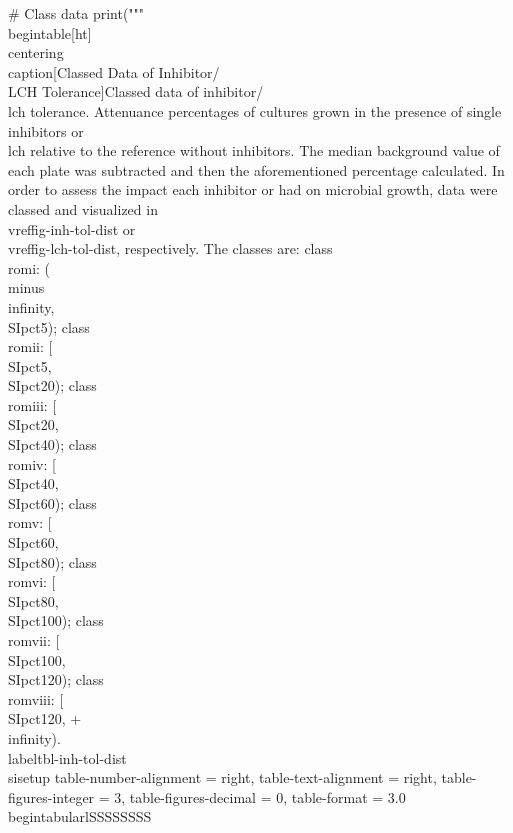 \begin{landscape}
\begin{pycode}
# Class data
print("""\\begin{table}[ht]
    \\centering
    \\caption[Classed Data of Inhibitor/\\LCH{} Tolerance]{Classed data of inhibitor/\\lch{} tolerance. Attenuance percentages of cultures grown in the presence of single inhibitors or \\lch{} relative to the reference without inhibitors. The median background value of each plate was subtracted and then the aforementioned percentage calculated. In order to assess the impact each inhibitor or \lch{} had on microbial growth, data were classed and visualized in \\vref{fig-inh-tol-dist} or \\vref{fig-lch-tol-dist}, respectively. The classes are: class~\\romi{}: (\\minus\\infinity, \\SIpct{5}); class~\\romii{}: [\\SIpct{5}, \\SIpct{20}); class~\\romiii{}: [\\SIpct{20}, \\SIpct{40}); class~\\romiv{}: [\\SIpct{40}, \\SIpct{60}); class~\\romv{}: [\\SIpct{60}, \\SIpct{80}); class~\\romvi{}: [\\SIpct{80}, \\SIpct{100}); class~\\romvii{}: [\\SIpct{100}, \\SIpct{120}); class~\\romviii{}: [\\SIpct{120}, +\\infinity).\\label{tbl-inh-tol-dist}}
    \\sisetup{
        table-number-alignment = right,
        table-text-alignment = right,
        table-figures-integer = 3,
        table-figures-decimal = 0,
        table-format = 3.0
    }
    \\begin{tabular}{lSSSSSSSS}

\end{pycode}
\end{landscape}
